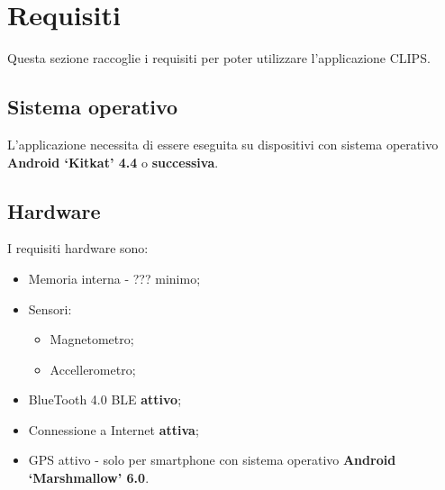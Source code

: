 \documentclass[../ClipsManualeUtente.tex]{subfiles}
\begin{document}
\section{Requisiti}
	Questa sezione raccoglie i requisiti per poter utilizzare l'applicazione CLIPS.
	
	\subsection{Sistema operativo}
		L'applicazione necessita di essere eseguita su dispositivi con sistema operativo \textbf{Android `Kitkat' 4.4} o \textbf{successiva}.
	
	\subsection{Hardware}
		I requisiti hardware sono:
		\begin{itemize}
			\item Memoria interna - ??? minimo;
			\item Sensori:
			\begin{itemize}
				\item Magnetometro;
				\item Accellerometro;
			\end{itemize}
			\item BlueTooth 4.0 BLE \textbf{attivo};
			\item Connessione a Internet \textbf{attiva};
			\item GPS attivo - solo per smartphone con sistema operativo \textbf{Android `Marshmallow' 6.0}.
		\end{itemize}
		
	
		
\end{document}
